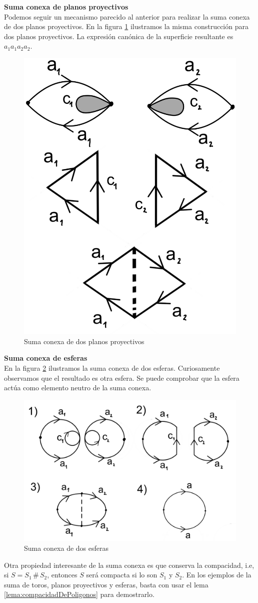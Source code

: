 \documentclass[a4paper,11pt,spanish, twoside, leqno]{tfg-uam}
\theoremstyle{definition}
\begin{document}
\noindent \textbf{Suma conexa de planos proyectivos}
\\
Podemos seguir un mecanismo parecido al anterior para realizar la suma conexa de dos planos proyectivos. En la figura \ref{fig:suma conexa de planos p} ilustramos la misma construcción para dos planos proyectivos. La expresión canónica de la superficie resultante es $ a_1a_1a_2a_2 $.

\begin{figure}[h!]
	\centering
	\includegraphics[width=0.3\linewidth]{imagenes/sumaconexa_planosp.png}
	\caption{Suma conexa de dos planos proyectivos}
	\label{fig:suma conexa de planos p}
\end{figure} 

\noindent \textbf{Suma conexa de esferas}
\\
En la figura \ref{fig:suma conexa de esferas} ilustramos la suma conexa de dos esferas. Curiosamente observamos que el resultado es otra esfera. Se puede comprobar que la esfera actúa como elemento neutro de la suma conexa.

\begin{figure}[h!]
	\centering
	\includegraphics[width=0.5\linewidth]{imagenes/sumaconexa_esferas.png}
	\caption{Suma conexa de dos esferas}
	\label{fig:suma conexa de esferas}
\end{figure} 

Otra propiedad interesante de la suma conexa es que conserva la compacidad, i.e, si $S=S_1 \, \# \, S_2$, entonces $S$ será compacta si lo son $S_1$ y $S_2$. En los ejemplos de la suma de toros, planos proyectivos y esferas, basta con usar el lema \ref{lema:compacidadDePoligonos} para demostrarlo.
\end{document}
